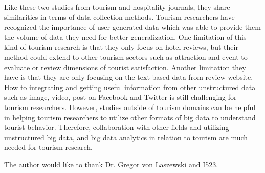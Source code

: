 \documentclass[sigconf]{acmart}
\begin{document}
Like these two studies from tourism and hospitality journals, they share similarities
in terms of data collection methods. Tourism researchers have recognized the
importance of user-generated data which was able to provide them the volume of data
they need for better generalization. One limitation of this kind of tourism research
is that they only focus on hotel reviews, but their method could extend to other
tourism sectors such as attraction and event to evaluate or review dimensions of
tourist satisfaction. Another limitation they have is that they are only focusing on
the text-based data from review website. How to integrating and getting useful
information from other unstructured data such as image, video, post on Facebook and
Twitter is still challenging for tourism researchers. However, studies outside of
tourism domains can be helpful in helping tourism researchers to utilize other formats
of big data to understand tourist behavior. Therefore, collaboration with other fields
and utilizing unstructured big data, and big data analytics in relation to tourism are
much needed for tourism research. 


\begin{acks}

  The author would like to thank Dr. Gregor von Laszewski and I523.

\end{acks}


 


\end{document}
